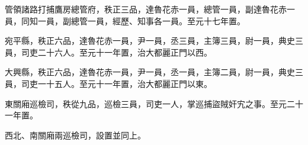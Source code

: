 \begin{pinyinscope}
 管領諸路打捕鷹房總管府，秩正三品，達魯花赤一員，總管一員，副達魯花赤一員，同知一員，副總管一員，經歷、知事各一員。至元十七年置。



 宛平縣，秩正六品，達魯花赤一員，尹一員，丞三員，主簿三員，尉一員，典史三員，司吏二十六人。至元十一年置，治大都麗正門以西。



 大興縣，秩正六品，達魯花赤一員，尹一員，丞一員，主簿二員，尉一員，典史三員，司吏一十五人。至元十一年置，治大都麗正門以東。



 東關廂巡檢司，秩從九品，巡檢三員，司吏一人，掌巡捕盜賊奸宄之事。至元二十一年置。



 西北、南關廂兩巡檢司，設置並同上。



\end{pinyinscope}